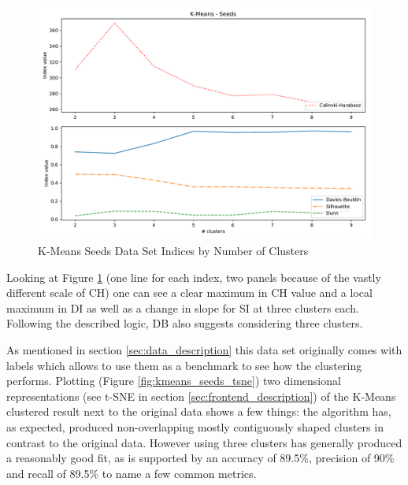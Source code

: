 \begin{figure}[H]
\centering
\includegraphics[width=1.0\textwidth]{images/kmeans_seeds_index_plot.pdf}
\caption{K-Means Seeds Data Set Indices by Number of Clusters}
\label{fig:kmeans_seeds_comparison_plot}
\end{figure}

\vspace{-0.5cm}
Looking at Figure \ref{fig:kmeans_seeds_comparison_plot} (one line for each index, two panels because of the vastly different scale of \gls{CH}) one can see a clear maximum in \gls{CH} value and a local maximum in \gls{DI} as well as a change in slope for \gls{SI} at three clusters each. Following the described logic, \gls{DB} also suggests considering three clusters. 

As mentioned in section \ref{sec:data_description} this data set originally comes with labels which allows to use them as a benchmark to see how the clustering performs. Plotting (Figure \ref{fig:kmeans_seeds_tsne}) two dimensional representations (see t-SNE in section \ref{sec:frontend_description}) of the K-Means clustered result next to the original data shows a few things: the algorithm has, as expected, produced non-overlapping mostly contiguously shaped clusters in contrast to the original data. However using three clusters has generally produced a reasonably good fit, as is supported by an accuracy of 89.5\%, precision of 90\% and recall of 89.5\% to name a few common metrics.

